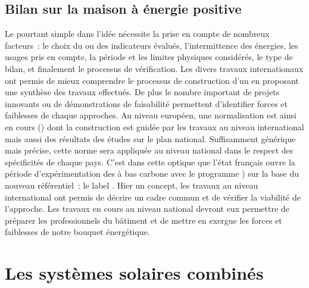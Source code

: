 \subsection{Bilan sur la maison à énergie positive} %
\label{sub:bilan_sur_la_BEPOS}
Le  pourtant simple dans l’idée nécessite la prise en compte de nombreux
facteurs~: le choix du ou des indicateurs évalués, l’intermittence des énergies, les
usages pris en compte, la période et les limites physiques considérés, le type de bilan, et
finalement le processus de vérification.
Les divers travaux internationaux ont permis de mieux comprendre le processus de
construction d’un  en proposant une synthèse des travaux effectués.
De plus le nombre important de projets innovants ou de démonstrations de faisabilité
permettent d’identifier forces et faiblesses de chaque approches.
Au niveau européen, une normalisation est ainsi en cours () dont la
construction est guidée par les travaux au niveau international mais aussi des résultats
des études sur le plan national. Suffisamment générique mais précise, cette norme
sera appliquée au niveau national dans le respect des spécificités de chaque
pays. C’est dans cette optique que l’état français ouvre la période d’expérimentation des
 à bas carbone avec le programme ) sur la base du nouveau référentiel~: le label .
Hier un concept, les travaux au niveau international ont permis de décrire un cadre
commun et de vérifier la viabilité de l’approche. Les travaux en cours au niveau
national devront eux permettre de préparer les professionnels du bâtiment et de mettre
en exergue les forces et faiblesses de notre bouquet énergétique.





\section{Les systèmes solaires combinés} %
\label{sec:les_systemes_solaires_combines}
